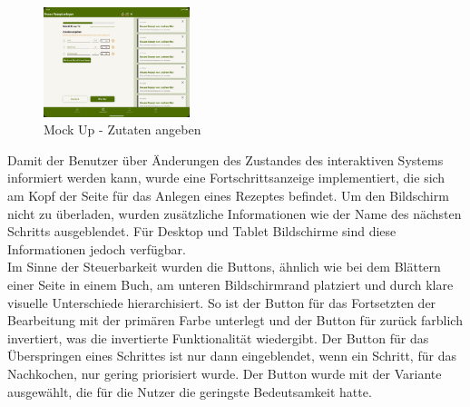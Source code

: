 \begin{figure}
    \centering
        \includegraphics[width=0.38\textwidth]{images/addingredient.png}
    \caption[Mock Up - Zutaten angeben]{Mock Up - Zutaten angeben}
\label{fig:mockup-addingredient}
\end{figure}
Damit der Benutzer über Änderungen des Zustandes des interaktiven Systems informiert werden kann, wurde eine Fortschrittsanzeige implementiert, die sich am Kopf der Seite für das Anlegen eines Rezeptes befindet. Um den Bildschirm nicht zu überladen, wurden zusätzliche Informationen wie der Name des nächsten Schritts ausgeblendet. Für Desktop und Tablet Bildschirme sind diese Informationen jedoch verfügbar. \\

Im Sinne der Steuerbarkeit wurden die Buttons, ähnlich wie bei dem Blättern einer Seite in einem Buch, am unteren Bildschirmrand platziert und durch klare visuelle Unterschiede hierarchisiert. So ist der Button für das Fortsetzten der Bearbeitung mit der primären Farbe unterlegt und der Button für zurück farblich invertiert, was die invertierte Funktionalität wiedergibt. Der Button für das Überspringen eines Schrittes ist nur dann eingeblendet, wenn ein Schritt, für das Nachkochen, nur gering priorisiert wurde. Der Button wurde mit der Variante ausgewählt, die für die Nutzer die geringste Bedeutsamkeit hatte. \\

